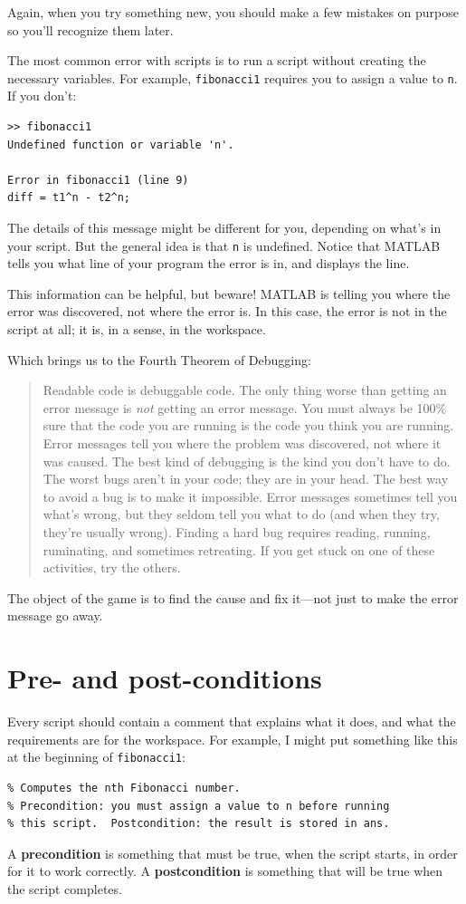 \documentclass[
]{book}
\newcommand{\displaythrm}[1]{%
    \ifthenelse{\equal{#1}{1}}%
        {Readable code is debuggable code.}{%
    \ifthenelse{\equal{#1}{2}}%
        {The only thing worse than getting an error message is {\em
         not} getting an error message.}{%
    \ifthenelse{\equal{#1}{3}}%
        {You must always be 100\% sure that the code you are running
         is the code you think you are running.}{%
    \ifthenelse{\equal{#1}{4}}%
        {Error messages tell you where the problem was discovered,
         not where it was caused.}{%
    \ifthenelse{\equal{#1}{5}}%
        {The best kind of debugging is the kind you don't have to do.}{%
    \ifthenelse{\equal{#1}{6}}%
        {The worst bugs aren't in your code; they are in your head.}{%
    \ifthenelse{\equal{#1}{7}}%
        {The best way to avoid a bug is to make it impossible.}{%
    \ifthenelse{\equal{#1}{8}}%
        {Error messages sometimes tell you what's wrong, but they
         seldom tell you what to do (and when they try, they're usually
         wrong).}{%
    \ifthenelse{\equal{#1}{9}}%
        {Finding a hard bug requires reading, running, ruminating,
         and sometimes retreating.  If you get stuck on one of these
         activities, try the others.}{%
    {}%
}}}}}}}}}}%
\begin{document}
Again, when you try something new, you should make a few mistakes
on purpose so you'll recognize them later.

The most common error with scripts is to run a script without creating
the necessary variables.  For example, {\tt fibonacci1} requires you
to assign a value to {\tt n}.  If you don't:

\begin{verbatim}
>> fibonacci1
Undefined function or variable 'n'.

Error in fibonacci1 (line 9)
diff = t1^n - t2^n;
\end{verbatim}

The details of this message might be different for you, depending
on what's in your script.  But the general idea is that {\tt n}
is undefined.  Notice that MATLAB tells you what line of your
program the error is in, and displays the line.

This information can be helpful, but beware!  MATLAB is telling you
where the error was discovered, not where the error is.  In this
case, the error is not in the script at all; it is, in a sense, in
the workspace.

Which brings us to the Fourth Theorem of Debugging:

\begin{quote}
\displaythrm{4}
\end{quote}

The object of the game is to find the cause and
fix it---not just to make the error message go away.


\section{Pre- and post-conditions}

Every script should contain a comment that explains
what it does, and what the requirements are for the workspace.  For
example, I might put something like this at the beginning of
{\tt fibonacci1}:

\begin{verbatim}
% Computes the nth Fibonacci number.
% Precondition: you must assign a value to n before running
% this script.  Postcondition: the result is stored in ans.
\end{verbatim}

A {\bf precondition} is something that must be true, when the script
starts, in order for it to work correctly.  A {\bf postcondition}
is something that will be true when the script completes.
\end{document}
